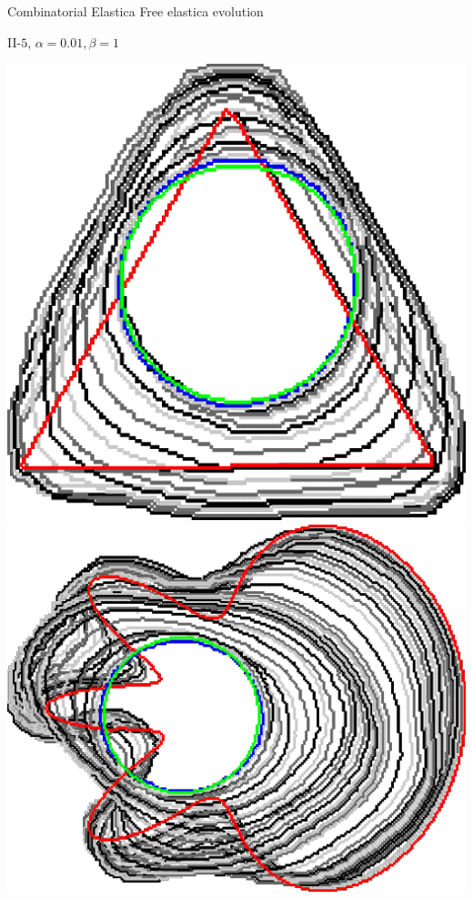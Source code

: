 \begin{frame}
	{Combinatorial Elastica}	
	{Free elastica evolution}

\begin{center}
II-$5$, $\alpha=0.01, \beta=1$
\end{center}
\begin{minipage}{0.49\textwidth}
\center
\includegraphics[scale=0.15]{figures/combinatorial-elastica/flow/ii/elastica/len_pen_0.01000/jonctions_1/curve_segs_4/best/gs_0.25000/triangle.png}\\[1em]
\includegraphics[scale=0.18]{figures/combinatorial-elastica/flow/ii/elastica/len_pen_0.01000/jonctions_1/curve_segs_4/best/gs_0.25000/flower.png}

\end{minipage}
\end{frame}
